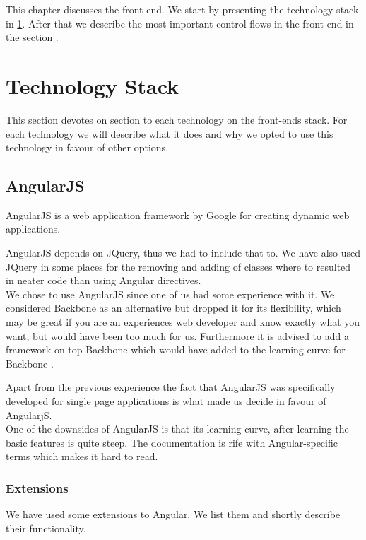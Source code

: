 This chapter discusses the front-end. We start by presenting the technology stack in \cref{sec:1:technologyStack}. After that we describe the most important control flows in the front-end in the section .

\section{Technology Stack}
\label{sec:1:technologyStack}
	This section devotes on section to each technology on the front-ends stack. For each technology we will describe what it does and why we opted to use this technology in favour of other options.

	\subsection{AngularJS}
	\label{ssec:1:angularjs}
		AngularJS is a web application framework by Google for creating dynamic web applications. 

		AngularJS depends on JQuery, thus we had to include that to. We have also used JQuery in some places for the removing and adding of classes where to resulted in neater code than using Angular directives.\\

		We chose to use AngularJS since one of us had some experience with it. We considered Backbone as an alternative but dropped it for its flexibility, which may be great if you are an experiences web developer and know exactly what you want, but would have been too much for us. Furthermore it is advised to add a framework on top Backbone which would have added to the learning curve for Backbone \cite{AComparisonofAngularBackboneCanJSandEmber}. 

		Apart from the previous experience the fact that AngularJS was specifically developed for single page applications is what made us decide in favour of AngularjS.\\

		One of the downsides of AngularJS is that its learning curve, after learning the basic features is quite steep. The documentation is rife with Angular-specific terms which makes it hard to read.

		\subsubsection*{Extensions}
		We have used some extensions to Angular. We list them and shortly describe their functionality.

